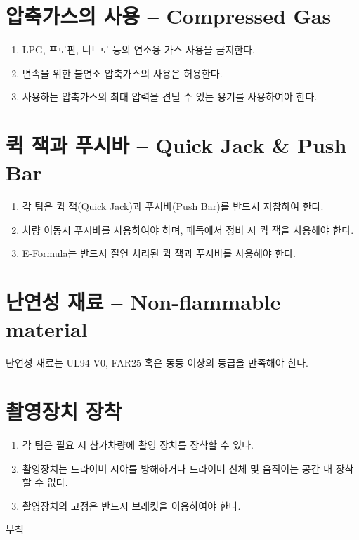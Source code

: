 \documentclass[final,a4paper,10pt]{report}
\begin{document}
\section{압축가스의 사용 – Compressed Gas}
\begin{enumerate}
  \item LPG, 프로판, 니트로 등의 연소용 가스 사용을 금지한다.
  \item 변속을 위한 불연소 압축가스의 사용은 허용한다.
  \item 사용하는 압축가스의 최대 압력을 견딜 수 있는 용기를 사용하여야 한다.
\end{enumerate}

\section{퀵 잭과 푸시바 – Quick Jack \& Push Bar}
\begin{enumerate}
  \item 각 팀은 퀵 잭(Quick Jack)과 푸시바(Push Bar)를 반드시 지참하여 한다.
  \item 차량 이동시 푸시바를 사용하여야 하며, 패독에서 정비 시 퀵 잭을 사용해야 한다.
  \item E-Formula는 반드시 절연 처리된 퀵 잭과 푸시바를 사용해야 한다.
\end{enumerate}

\section{난연성 재료 – Non-flammable material} \label{section:난연성 재료}
난연성 재료는 UL94-V0, FAR25 혹은 동등 이상의 등급을 만족해야 한다.

\section{촬영장치 장착}
\begin{enumerate}
  \item 각 팀은 필요 시 참가차량에 촬영 장치를 장착할 수 있다.
  \item 촬영장치는 드라이버 시야를 방해하거나 드라이버 신체 및 움직이는 공간 내 장착할 수 없다.
  \item 촬영장치의 고정은 반드시 브래킷을 이용하여야 한다.
\end{enumerate}

\clearpage

\begin{center}
  부칙
\end{center}
\end{document}
